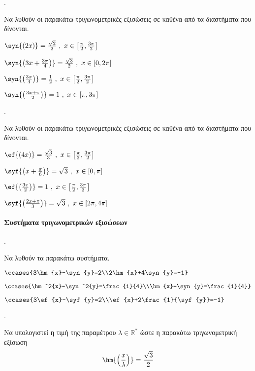 \documentclass[11pt,a4paper,twocolumn]{article}
\newcounter{askhsh}
\newcommand{\askhsh}{\large\theaskhsh.\ \addtocounter{askhsh}{1}}
\begin{document}
\askhsh Να λυθούν οι παρακάτω τριγωνομετρικές εξισώσεις σε καθένα από τα διαστήματα που δίνονται.
\begin{alist}
\item $ \syn{(2x)}=\frac{\sqrt{2}}{2}\ ,\ x\in\left[\frac{\pi}{2},\frac{3\pi}{2}\right]  $
\item $ \syn{\left(3x+\frac{3\pi}{4}\right) }=\frac{\sqrt{3}}{2}\ ,\ x\in[0,2\pi] $
\item $ \syn{\left(\frac{3x}{4}\right) }=\frac{1}{2}\ ,\ x\in\left[\frac{\pi}{2},\frac{3\pi}{2}\right]  $
\item $ \syn{\left(\frac{3x+\pi}{2}\right) }=1\ ,\ x\in[\pi,3\pi] $
\end{alist}
\askhsh Να λυθούν οι παρακάτω τριγωνομετρικές εξισώσεις σε καθένα από τα διαστήματα που δίνονται.
\begin{alist}
\item $ \ef{(4x)}=\frac{\sqrt{3}}{3}\ ,\ x\in\left[\frac{\pi}{2},\frac{3\pi}{2}\right]  $
\item $ \syf{\left(x+\frac{\pi}{6}\right) }=\sqrt{3}\ ,\ x\in[0,\pi] $
\item $ \ef{\left(\frac{3x}{2}\right) }=1\ ,\ x\in\left[\frac{\pi}{2},\frac{3\pi}{2}\right]  $
\item $ \syf{\left(\frac{2x+\pi}{3}\right) }=\sqrt{3}\ ,\ x\in[2\pi,4\pi] $
\end{alist}
\paragraph{Συστήματα τριγωνομετρικών εξισώσεων}
\askhsh 
Να λυθούν τα παρακάτω συστήματα.
\begin{alist}
\item $ \ccases{3\hm{x}-\syn{y}=2\\2\hm{x}+4\syn{y}=-1} $
\item $ \ccases{\hm^2{x}-\syn^2{y}=\frac{1}{4}\\\hm{x}+\syn{y}=\frac{1}{4}} $
\item $ \ccases{3\ef{x}-\syf{y}=2\\\ef{x}+2\frac{1}{\syf{y}}=-1} $
\end{alist}
\askhsh Να υπολογιστεί η τιμή της παραμέτρου $ \lambda\in\mathbb{R}^* $ ώστε η παρακάτω τριγωνομετρική εξίσωση \[ \hm{\left( \frac{x}{\lambda}\right) }=\frac{\sqrt{3}}{2} \]
\end{document}
